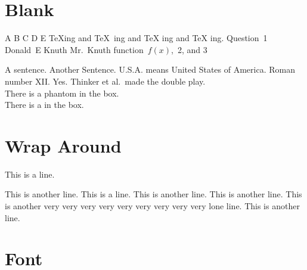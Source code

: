 \documentclass{article}
\begin{document}
    \section{Blank}
        A B  C   D    E\newline
        \TeX ing and \TeX\ ing and \TeX{} ing and {\TeX} ing. \newline 
        Question~1\newline          %
        Donald~E Knuth\newline      %
        Mr.~Knuth\newline           %
        function~$f(x)$,~2, and 3\newline         %
        
        A sentence. Another Sentence. \newline              %
        U.S.A. means United States of America. \newline     %
        Roman number XII\@. Yes. \newline                   %
        Thinker et al.\ made the double play. \\              %
        
        There is a phantom in the box. \\
        There is a \phantom{phantom} in the box. 

    \section{Wrap Around}
        This is a line. 

        This is another line. \newline
        This is a line. \newline
        This is another line. \linebreak
        This is another line. \linebreak[4]
        This is another very very very very 
        very very very very very lone line. \linebreak[3]
        This is another line. 

        
    \section{Font}
\end{document}
